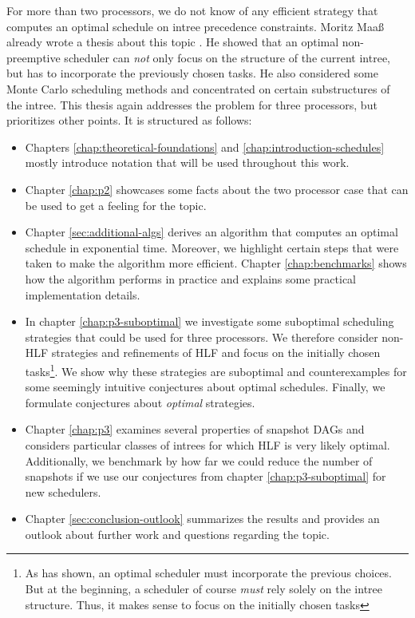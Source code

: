 For more than two processors, we do not know of any efficient strategy that computes an optimal schedule on intree precedence constraints. Moritz Maaß already wrote a thesis about this topic \cite{MoritzMaasDiploma}. He showed that an optimal non-preemptive scheduler can \emph{not} only focus on the structure of the current intree, but has to incorporate the previously chosen tasks. He also considered some Monte Carlo scheduling methods and concentrated on certain substructures of the intree. This thesis again addresses the problem for three processors, but prioritizes other points. It is structured as follows:

\begin{itemize}
\item Chapters \ref{chap:theoretical-foundations} and \ref{chap:introduction-schedules} mostly introduce notation that will be used throughout this work. 
\item Chapter \ref{chap:p2} showcases some facts about the two processor case that can be used to get a feeling for the topic.
\item Chapter \ref{sec:additional-algs} derives an algorithm that computes an optimal schedule in exponential time. Moreover, we highlight certain steps that were taken to make the algorithm more efficient. Chapter \ref{chap:benchmarks} shows how the algorithm performs in practice and explains some practical implementation details.
\item In chapter \ref{chap:p3-suboptimal} we investigate some suboptimal scheduling strategies that could be used for three processors. We therefore consider non-HLF strategies and refinements of HLF and focus on the initially chosen tasks\footnote{As \cite{MoritzMaasDiploma} has shown, an optimal scheduler must incorporate the previous choices. But at the beginning, a scheduler of course \emph{must} rely solely on the intree structure. Thus, it makes sense to focus on the initially chosen tasks}. We show why these strategies are suboptimal and counterexamples for some seemingly intuitive conjectures about optimal schedules. Finally, we formulate conjectures about \emph{optimal} strategies.
\item Chapter \ref{chap:p3} examines several properties of snapshot DAGs and considers particular classes of intrees for which HLF is very likely optimal. Additionally, we benchmark by how far we could reduce the number of snapshots if we use our conjectures from chapter \ref{chap:p3-suboptimal} for new schedulers.
\item Chapter \ref{sec:conclusion-outlook} summarizes the results and provides an outlook about further work and questions regarding the topic.
\end{itemize}

